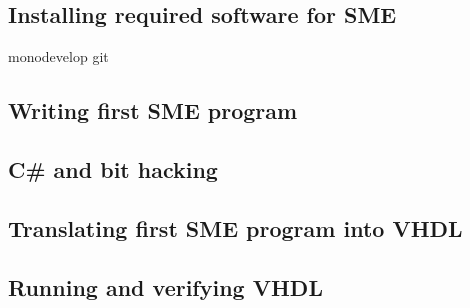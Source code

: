 \subsection{Installing required software for SME}
monodevelop git
\subsection{Writing first SME program}
\subsection{C\# and bit hacking}
\subsection{Translating first SME program into VHDL}
\subsection{Running and verifying VHDL}

